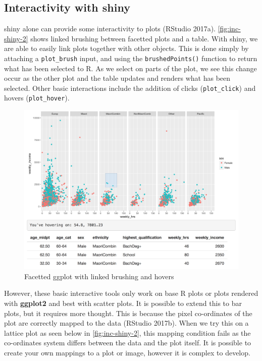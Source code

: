 \documentclass[11pt,]{report}
\begin{document}
\subsection{Interactivity with shiny}\label{interactivity-with-shiny}

\textsf{shiny} alone can provide some interactivity to plots (RStudio
2017a). \autoref{fig:inc-shiny-2} shows linked brushing between facetted
plots and a table. With shiny, we are able to easily link plots together
with other objects. This is done simply by attaching a
\texttt{plot\_brush} input, and using the \texttt{brushedPoints()}
function to return what has been selected to R. As we select on parts of
the plot, we see this change occur as the other plot and the table
updates and renders what has been selected. Other basic interactions
include the addition of clicks (\texttt{plot\_click}) and hovers
(\texttt{plot\_hover}).

\begin{figure}[H]

{\centering \includegraphics[width=0.6\linewidth,]{./fig/inc-shiny-1} 

}

\caption{\label{fig:inc-shiny-1} Facetted ggplot with linked brushing and hovers}\label{fig:unnamed-chunk-20}
\end{figure}

However, these basic interactive tools only work on base R plots or
plots rendered with \textbf{ggplot2} and best with scatter plots. It is
possible to extend this to bar plots, but it requires more thought. This
is because the pixel co-ordinates of the plot are correctly mapped to
the data (RStudio 2017b). When we try this on a lattice plot as seen
below in \autoref{fig:inc-shiny-2}, this mapping condition fails as the
co-ordinates system differs between the data and the plot itself. It is
possible to create your own mappings to a plot or image, however it is
complex to develop.
\end{document}
